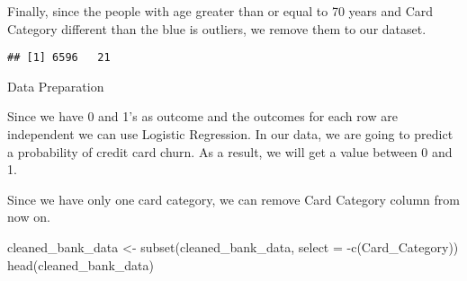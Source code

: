 \documentclass[
]{article}
\newenvironment{Shaded}{\begin{snugshade}}{\end{snugshade}}
\newcommand{\AttributeTok}[1]{\textcolor[rgb]{0.77,0.63,0.00}{#1}}
\newcommand{\DecValTok}[1]{\textcolor[rgb]{0.00,0.00,0.81}{#1}}
\newcommand{\FunctionTok}[1]{\textcolor[rgb]{0.00,0.00,0.00}{#1}}
\newcommand{\NormalTok}[1]{#1}
\newcommand{\OtherTok}[1]{\textcolor[rgb]{0.56,0.35,0.01}{#1}}
\newcommand{\SpecialCharTok}[1]{\textcolor[rgb]{0.00,0.00,0.00}{#1}}
\begin{document}
Finally, since the people with age greater than or equal to 70 years and
Card Category different than the blue is outliers, we remove them to our
dataset.

\begin{Shaded}
\end{Shaded}

\begin{verbatim}
## [1] 6596   21
\end{verbatim}

Data Preparation

Since we have 0 and 1's as outcome and the outcomes for each row are
independent we can use Logistic Regression. In our data, we are going to
predict a probability of credit card churn. As a result, we will get a
value between 0 and 1.

Since we have only one card category, we can remove Card Category column
from now on.

\begin{Shaded}
\begin{Highlighting}[]
\NormalTok{cleaned\_bank\_data }\OtherTok{\textless{}{-}} \FunctionTok{subset}\NormalTok{(cleaned\_bank\_data, }\AttributeTok{select =} \SpecialCharTok{{-}}\FunctionTok{c}\NormalTok{(Card\_Category))}
\FunctionTok{head}\NormalTok{(cleaned\_bank\_data)}
\end{Highlighting}
\end{Shaded}
\end{document}
